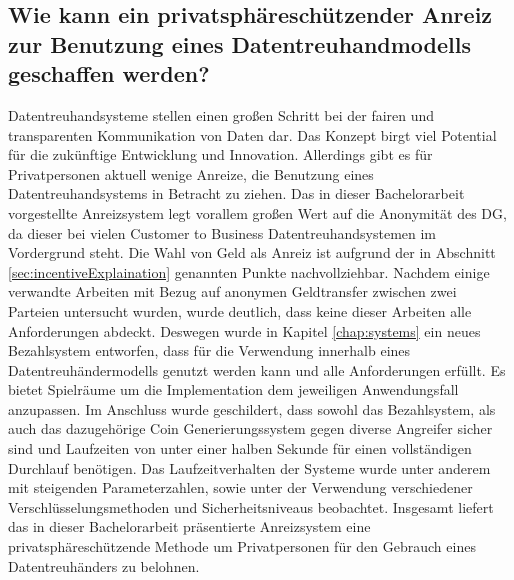 \documentclass[
	fontsize=11pt,
	headings=small,
	parskip=half,           %
	bibliography=totoc,
	numbers=noenddot,       %
	open=any,               %
]{scrreprt}
\begin{document}
\subsection{Wie kann ein privatsphäreschützender Anreiz zur Benutzung eines Datentreuhandmodells geschaffen werden?}
Datentreuhandsysteme stellen einen großen Schritt bei der fairen und transparenten Kommunikation von Daten dar. Das Konzept birgt viel Potential für die zukünftige Entwicklung und Innovation. Allerdings gibt es für Privatpersonen aktuell wenige Anreize, die Benutzung eines Datentreuhandsystems in Betracht zu ziehen. Das in dieser Bachelorarbeit vorgestellte Anreizsystem legt vorallem großen Wert auf die Anonymität des DG, da dieser bei vielen Customer to Business Datentreuhandsystemen im Vordergrund steht. Die Wahl von Geld als Anreiz ist aufgrund der in Abschnitt \ref{sec:incentiveExplaination} genannten Punkte nachvollziehbar. Nachdem einige verwandte Arbeiten mit Bezug auf anonymen Geldtransfer zwischen zwei Parteien untersucht wurden, wurde deutlich, dass keine dieser Arbeiten alle Anforderungen abdeckt. Deswegen wurde in Kapitel \ref{chap:systems} ein neues Bezahlsystem entworfen, dass für die Verwendung innerhalb eines Datentreuhändermodells genutzt werden kann und alle Anforderungen erfüllt. Es bietet Spielräume um die Implementation dem jeweiligen Anwendungsfall anzupassen. Im Anschluss wurde geschildert, dass sowohl das Bezahlsystem, als auch das dazugehörige Coin Generierungssystem gegen diverse Angreifer sicher sind und Laufzeiten von unter einer halben Sekunde für einen vollständigen Durchlauf benötigen. Das Laufzeitverhalten der Systeme wurde unter anderem mit steigenden Parameterzahlen, sowie unter der Verwendung verschiedener Verschlüsselungsmethoden und Sicherheitsniveaus beobachtet. Insgesamt liefert das in dieser Bachelorarbeit präsentierte Anreizsystem eine privatsphäreschützende Methode um Privatpersonen für den Gebrauch eines Datentreuhänders zu belohnen.
\end{document}
